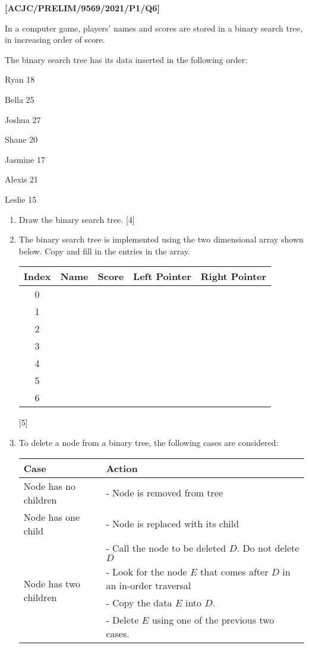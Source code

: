 \item \textbf{{[}ACJC/PRELIM/9569/2021/P1/Q6{]} }

In a computer game, players\textquoteright{} names and scores are
stored in a binary search tree, in increasing order of score.

The binary search tree has its data inserted in the following order:

Ryan 18 

Bella 25 

Joshua 27 

Shane 20 

Jasmine 17 

Alexis 21 

Leslie 15
\begin{enumerate}
\item Draw the binary search tree. \hfill{}{[}4{]}
\item The binary search tree is implemented using the two dimensional array
shown below. Copy and fill in the entries in the array.
\noindent \begin{center}
\begin{tabular}{|c|c|c|c|c|}
\hline 
Index & Name & Score & Left Pointer & Right Pointer\tabularnewline
\hline 
0 &  &  &  & \tabularnewline
\hline 
1 &  &  &  & \tabularnewline
\hline 
2 &  &  &  & \tabularnewline
\hline 
3 &  &  &  & \tabularnewline
\hline 
4 &  &  &  & \tabularnewline
\hline 
5 &  &  &  & \tabularnewline
\hline 
6 &  &  &  & \tabularnewline
\hline 
\end{tabular}
\par\end{center}

\hfill{}{[}5{]}
\item To delete a node from a binary tree, the following cases are considered:
\noindent \begin{center}
\begin{tabular}{|l|l|}
\hline 
Case & Action\tabularnewline
\hline 
Node has no children & - Node is removed from tree\tabularnewline
\hline 
Node has one child & - Node is replaced with its child\tabularnewline
\hline 
\multirow{4}{*}{Node has two children} & - Call the node to be deleted $D$. Do not delete$D$\tabularnewline
\cline{2-2} 
 & - Look for the node $E$ that comes after $D$ in an in-order traversal\tabularnewline
\cline{2-2} 
 & - Copy the data $E$ into $D$.\tabularnewline
\cline{2-2} 
 & - Delete $E$ using one of the previous two cases.\tabularnewline
\hline 
\end{tabular}
\par\end{center}


\end{enumerate}
